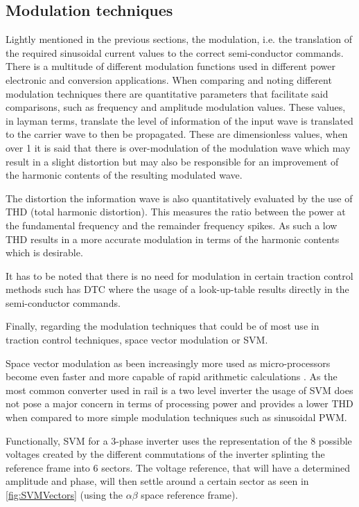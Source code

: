 \subsection{Modulation techniques}
Lightly mentioned in the previous sections, the modulation, i.e. the translation of the required sinusoidal current values to the correct semi-conductor commands. There is a multitude of different modulation functions used in different power electronic and conversion applications. When comparing and noting different modulation techniques there are quantitative parameters that facilitate said comparisons, such as frequency and amplitude modulation values. These values, in layman terms, translate the level of information of the input wave is translated to the carrier wave to then be propagated. These are dimensionless values, when over 1 it is said that there is over-modulation of the modulation wave which may result in a slight distortion but may also be responsible for an improvement of the harmonic contents of the resulting modulated wave.

The distortion the information wave is also quantitatively evaluated by the use of THD (total harmonic distortion). This measures the ratio between the power at the fundamental frequency and the remainder frequency spikes. As such a low THD results in a more accurate modulation in terms of the harmonic contents which is desirable.

It has to be noted that there is no need for modulation in certain traction control methods such has DTC where the usage of a look-up-table results directly in the semi-conductor commands. 

Finally, regarding the modulation techniques that could be of most use in traction control techniques, space vector modulation or SVM. 

Space vector modulation as been increasingly more used as micro-processors become even faster and more capable of rapid arithmetic calculations \cite{ModulationTechniques}. As the most common converter used in rail is a two level inverter the usage of SVM does not pose a major concern in terms of processing power and provides a lower THD when compared to more simple modulation techniques such as sinusoidal PWM\cite{ModulationTechniques}.

Functionally, SVM for a 3-phase inverter uses the representation of the 8 possible voltages created by the different commutations of the inverter splinting the reference frame into 6 sectors. The voltage reference, that will have a determined amplitude and phase, will then settle around a certain sector as seen in \ref{fig:SVMVectors} (using the $\alpha \beta$ space reference frame).

